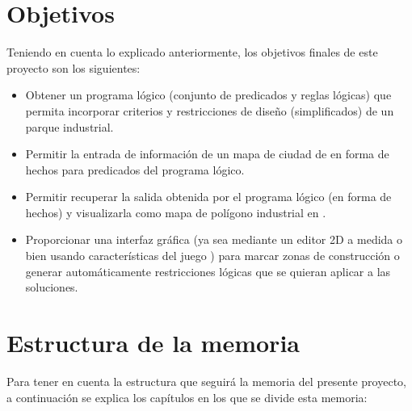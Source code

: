 \section{Objetivos}

Teniendo en cuenta lo explicado anteriormente, los objetivos finales de este proyecto son los siguientes:

\begin{itemize}
	\item Obtener un programa lógico (conjunto de predicados y reglas lógicas) que permita incorporar criterios y restricciones de diseño (simplificados) de un parque industrial.
	\item Permitir la entrada de información de un mapa de ciudad de \cities en forma de hechos para predicados del programa lógico.
	\item Permitir recuperar la salida obtenida por el programa lógico (en forma de hechos) y visualizarla como mapa de polígono industrial en \cities.
	\item Proporcionar una interfaz gráfica (ya sea mediante un editor 2D a medida o bien usando características del juego \cities) para marcar zonas de construcción o generar automáticamente restricciones lógicas que se quieran aplicar a las soluciones.
\end{itemize}

\section{Estructura de la memoria}

Para tener en cuenta la estructura que seguirá la memoria del presente proyecto, a continuación se explica los capítulos en los que se divide esta memoria:

